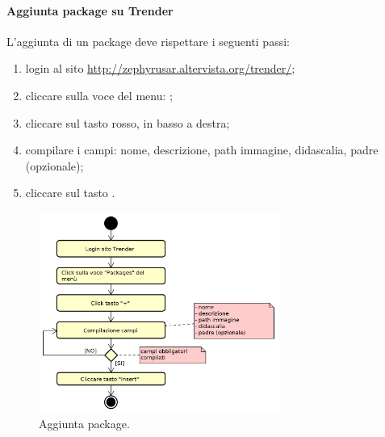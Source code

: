 		\paragraph{Aggiunta package su Trender} \label{sec:traccComp}
		L'aggiunta di un package deve rispettare i seguenti passi:
		\begin{enumerate}
			\item login al sito \url{http://zephyrusar.altervista.org/trender/};
			\item cliccare sulla voce del menu: ;
			\item cliccare sul tasto \hicode{+} rosso, in basso a destra;
			\item compilare i campi: nome, descrizione, path immagine, didascalia, padre (opzionale);
			\item cliccare sul tasto .
		\end{enumerate}
		\begin{figure}[H]
			\centering
			\includegraphics[width=0.7\textwidth]{img/AggiuntaPack}
			\caption{Aggiunta package.}
		\end{figure}
		
